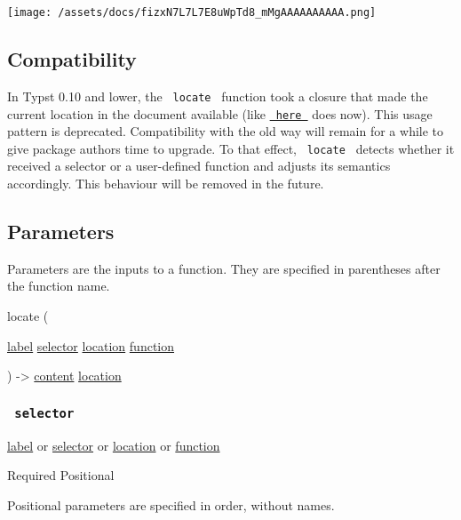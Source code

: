 \texttt{[image: /assets/docs/fizxN7L7L7E8uWpTd8\_mMgAAAAAAAAAA.png]}

\subsection{Compatibility}\label{compatibility}

In Typst 0.10 and lower, the \texttt{\ locate\ } function took a closure
that made the current location in the document available (like
\href{/docs/reference/introspection/here/}{\texttt{\ here\ }} does now).
This usage pattern is deprecated. Compatibility with the old way will
remain for a while to give package authors time to upgrade. To that
effect, \texttt{\ locate\ } detects whether it received a selector or a
user-defined function and adjusts its semantics accordingly. This
behaviour will be removed in the future.

\subsection{\texorpdfstring{{ Parameters
}}{ Parameters }}\label{parameters}

\label{parameters-tooltip}
Parameters are the inputs to a function. They are specified in
parentheses after the function name.

{ locate } (

{ \href{/docs/reference/foundations/label/}{label}
\href{/docs/reference/foundations/selector/}{selector}
\href{/docs/reference/introspection/location/}{location}
\href{/docs/reference/foundations/function/}{function} }

) -\textgreater{} \href{/docs/reference/foundations/content/}{content}
\href{/docs/reference/introspection/location/}{location}

\subsubsection{\texorpdfstring{\texttt{\ selector\ }}{ selector }}\label{parameters-selector}

\href{/docs/reference/foundations/label/}{label} {or}
\href{/docs/reference/foundations/selector/}{selector} {or}
\href{/docs/reference/introspection/location/}{location} {or}
\href{/docs/reference/foundations/function/}{function}

{Required} {{ Positional }}

\label{parameters-selector-positional-tooltip}
Positional parameters are specified in order, without names.


